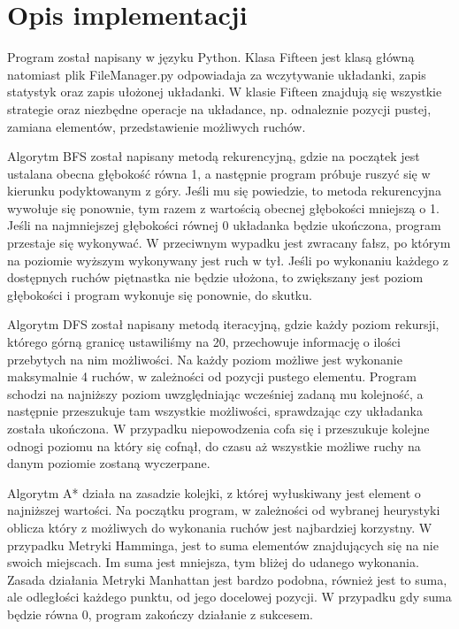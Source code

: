 \documentclass{classrep}
\begin{document}
\section{Opis implementacji}
{
Program został napisany w języku Python. Klasa Fifteen jest klasą główną natomiast plik FileManager.py odpowiadaja za wczytywanie układanki, zapis statystyk oraz zapis ułożonej układanki. W klasie Fifteen znajdują się wszystkie strategie oraz niezbędne operacje na układance, np. odnaleznie pozycji pustej, zamiana elementów, przedstawienie możliwych ruchów.

Algorytm BFS został napisany metodą rekurencyjną, gdzie na początek jest ustalana obecna głębokość równa 1, a następnie program próbuje ruszyć się w kierunku podyktowanym z góry.
Jeśli mu się powiedzie, to metoda rekurencyjna wywołuje się ponownie, tym razem z wartością obecnej głębokości mniejszą o 1. Jeśli na najmniejszej głębokości równej 0 układanka będzie ukończona, program przestaje się wykonywać. W przeciwnym wypadku jest zwracany fałsz, po którym na poziomie wyższym wykonywany jest ruch w tył. Jeśli po wykonaniu każdego z dostępnych ruchów piętnastka nie będzie ułożona, to zwiększany jest poziom głębokości i program wykonuje się ponownie, do skutku.

Algorytm DFS został napisany metodą iteracyjną, gdzie każdy poziom rekursji, którego górną granicę ustawiliśmy na 20, przechowuje informację o ilości przebytych na nim możliwości. Na każdy poziom możliwe jest wykonanie maksymalnie 4 ruchów, w zależności od pozycji pustego elementu. Program schodzi na najniższy poziom uwzględniając wcześniej zadaną mu kolejność, a następnie przeszukuje tam wszystkie możliwości, sprawdzając czy układanka została ukończona. W przypadku niepowodzenia cofa się i przeszukuje kolejne odnogi poziomu na który się cofnął, do czasu aż wszystkie możliwe ruchy na danym poziomie zostaną wyczerpane.

Algorytm A* działa na zasadzie kolejki, z której wyłuskiwany jest element o najniższej wartości. Na początku program, w zależności od wybranej heurystyki oblicza który z możliwych do wykonania ruchów jest najbardziej korzystny. W przypadku Metryki Hamminga, jest to suma elementów znajdujących się na nie swoich miejscach. Im suma jest mniejsza, tym bliżej do udanego wykonania. Zasada działania Metryki Manhattan jest bardzo podobna, również jest to suma, ale odległości każdego punktu, od jego docelowej pozycji. W przypadku gdy suma będzie równa 0, program zakończy działanie z sukcesem.}
\end{document}
